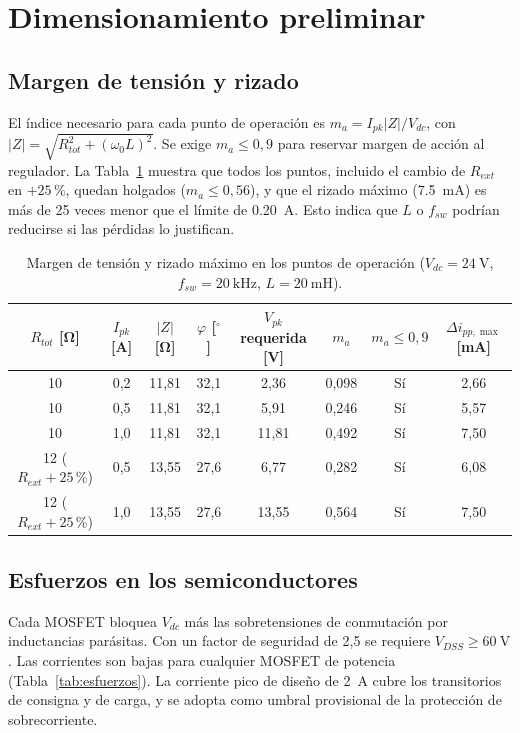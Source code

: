 \documentclass[10pt,twocolumn,letterpaper]{article}
\begin{document}
\section{Dimensionamiento preliminar}
\subsection{Margen de tensión y rizado}
El índice necesario para cada punto de operación es $m_a=I_{pk}|Z|/V_{dc}$, con $|Z|=\sqrt{R_{tot}^2+(\omega_0 L)^2}$. Se exige $m_a\le 0{,}9$ para reservar margen de acción al regulador. La Tabla~\ref{tab:margen} muestra que todos los puntos, incluido el cambio de $R_{ext}$ en $+25\,\%$, quedan holgados ($m_a\le 0{,}56$), y que el rizado máximo (\SI{7,5}{\milli\ampere}) es más de 25 veces menor que el límite de \SI{0,20}{\ampere}. Esto indica que $L$ o $f_{sw}$ podrían reducirse si las pérdidas lo justifican.

\begin{table}[!t]
\centering
\caption{Margen de tensión y rizado máximo en los puntos de operación ($V_{dc}=\SI{24}{\volt}$, $f_{sw}=\SI{20}{\kilo\hertz}$, $L=\SI{20}{\milli\henry}$).}
\label{tab:margen}
\small
\begin{tabular}{@{}cccccccc@{}}
\toprule
$R_{tot}$ [\si{\ohm}] & $I_{pk}$ [A] & $|Z|$ [\si{\ohm}] & $\varphi$ [$^\circ$] & $V_{pk}$ requerida [V] & $m_a$ & $m_a\le 0{,}9$ & $\Delta i_{pp,\max}$ [mA] \\
\midrule
10 & 0,2 & 11,81 & 32,1 & 2,36 & 0,098 & Sí & 2,66 \\
10 & 0,5 & 11,81 & 32,1 & 5,91 & 0,246 & Sí & 5,57 \\
10 & 1,0 & 11,81 & 32,1 & 11,81 & 0,492 & Sí & 7,50 \\
12 ($R_{ext}+25\,\%$) & 0,5 & 13,55 & 27,6 & 6,77 & 0,282 & Sí & 6,08 \\
12 ($R_{ext}+25\,\%$) & 1,0 & 13,55 & 27,6 & 13,55 & 0,564 & Sí & 7,50 \\
\bottomrule
\end{tabular}
\end{table}

\subsection{Esfuerzos en los semiconductores}
Cada MOSFET bloquea $V_{dc}$ más las sobretensiones de conmutación por inductancias parásitas. Con un factor de seguridad de 2,5 se requiere $V_{DSS}\ge\SI{60}{\volt}$. Las corrientes son bajas para cualquier MOSFET de potencia (Tabla~\ref{tab:esfuerzos}). La corriente pico de diseño de \SI{2}{\ampere} cubre los transitorios de consigna y de carga, y se adopta como umbral provisional de la protección de sobrecorriente.
\end{document}
